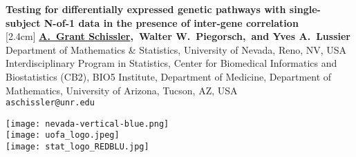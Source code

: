 \documentclass[a0,portrait]{a0poster}
\begin{document}


\begin{minipage}[b]{0.75\linewidth}
\VeryHuge \color{NavyBlue} \textbf{Testing for differentially expressed genetic pathways with single-subject N-of-1 data in the presence of inter-gene correlation} \color{Black}\\ %
[2.4cm]
\Huge \textbf{\underline{A.~Grant Schissler},~Walter W.~Piegorsch,~and Yves A.~Lussier}\\[0.5cm] %
\huge Department of Mathematics \& Statistics, University of Nevada, Reno, NV, USA\\[0.4cm] %
{\huge Interdisciplinary Program in Statistics, Center for Biomedical Informatics and Biostatistics (CB2), BIO5 Institute, Department of Medicine, Department of Mathematics, University of Arizona, Tucson, AZ, USA}\\[0.4cm]
\Large \texttt{aschissler@unr.edu}\\
\end{minipage}
%
\begin{minipage}[b]{0.25\linewidth}
  \centering
  \texttt{[image: nevada-vertical-blue.png]}\\
  \texttt{[image: uofa\_logo.jpeg]}\\
  \texttt{[image: stat\_logo\_REDBLU.jpg]}\\

\end{minipage}

\vspace{1cm} %

\end{document}
